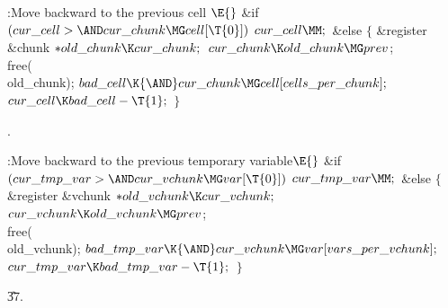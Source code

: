 \B{}:Move  backward to the previous cell%
\X${}\E{}$\6
\&{if} ${}(\\{cur\_cell}>{\AND}\\{cur\_chunk}\MG\\{cell}[\T{0}]){}$\1\5
${}\\{cur\_cell}\MM;{}$\2\6
\&{else}\5
${}\{{}$\1\6
\&{register} \&{chunk} ${}{*}\\{old\_chunk}\K\\{cur\_chunk};{}$\7
${}\\{cur\_chunk}\K\\{old\_chunk}\MG\\{prev}{}$;\5
\\{free}(\\{old\_chunk});\6
${}\\{bad\_cell}\K{\AND}\\{cur\_chunk}\MG\\{cell}[\\{cells\_per\_chunk}];{}$\6
${}\\{cur\_cell}\K\\{bad\_cell}-\T{1};{}$\6
\4${}\}{}$\2\par
{}.\fi

\B{}:Move  backward to the previous
temporary variable\X${}\E{}$\6
\&{if} ${}(\\{cur\_tmp\_var}>{\AND}\\{cur\_vchunk}\MG\\{var}[\T{0}]){}$\1\5
${}\\{cur\_tmp\_var}\MM;{}$\2\6
\&{else}\5
${}\{{}$\1\6
\&{register} \&{vchunk} ${}{*}\\{old\_vchunk}\K\\{cur\_vchunk};{}$\7
${}\\{cur\_vchunk}\K\\{old\_vchunk}\MG\\{prev}{}$;\5
\\{free}(\\{old\_vchunk});\6
${}\\{bad\_tmp\_var}\K{\AND}\\{cur\_vchunk}\MG\\{var}[\\{vars\_per%
\_vchunk}];{}$\6
${}\\{cur\_tmp\_var}\K\\{bad\_tmp\_var}-\T{1};{}$\6
\4${}\}{}$\2\par
\U37.\fi

